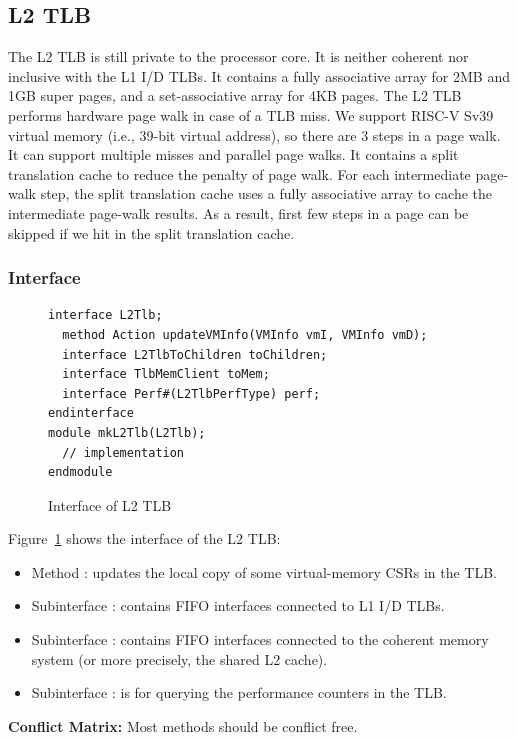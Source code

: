 \subsection{L2 TLB}
The L2 TLB is still private to the processor core.
It is neither coherent nor inclusive with the L1 I/D TLBs.
It contains a fully associative array for 2MB and 1GB super pages, and a set-associative array for 4KB pages.
The L2 TLB performs hardware page walk in case of a TLB miss.
We support RISC-V Sv39 virtual memory (i.e., 39-bit virtual address), so there are 3 steps in a page walk.
It can support multiple misses and parallel page walks.
It contains a split translation cache to reduce the penalty of page walk.
For each intermediate page-walk step, the split translation cache uses a fully associative array to cache the intermediate page-walk results.
As a result, first few steps in a page can be skipped if we hit in the split translation cache.

\subsubsection{Interface}

\begin{figure}
\begin{lstlisting}[caption={}]
interface L2Tlb;
  method Action updateVMInfo(VMInfo vmI, VMInfo vmD);
  interface L2TlbToChildren toChildren;
  interface TlbMemClient toMem;
  interface Perf#(L2TlbPerfType) perf;
endinterface
module mkL2Tlb(L2Tlb);
  // implementation
endmodule
\end{lstlisting}
\caption{Interface of L2 TLB}\label{fig:l2-tlb-ifc}
\end{figure}

Figure~\ref{fig:l2-tlb-ifc} shows the interface of the L2 TLB:
\begin{itemize}
    \item Method : updates the local copy of some virtual-memory CSRs in the TLB.
    \item Subinterface : contains FIFO interfaces connected to L1 I/D TLBs.
    \item Subinterface : contains FIFO interfaces connected to the coherent memory system (or more precisely, the shared L2 cache).
    \item Subinterface : is for querying the performance counters in the TLB.
\end{itemize}

\noindent\textbf{Conflict Matrix:}
Most methods should be conflict free.

